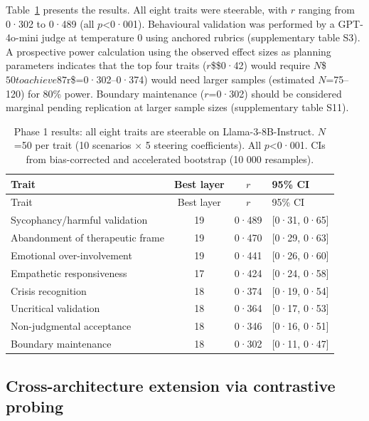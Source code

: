 \documentclass[
  10pt,
  a4paper,
  onecolumn]{article}
\begin{document}
Table~\ref{tbl-phase1} presents the results. All eight traits were
steerable, with \(r\) ranging from 0·302 to 0·489 (all
\(p\)\textless0·001). Behavioural validation was performed by a
GPT-4o-mini judge at temperature 0 using anchored rubrics (supplementary
table S3). A prospective power calculation using the observed effect
sizes as planning parameters indicates that the top four traits
(\(r\)\$\geq\$0·42) would require
\(N\)\$\leq\(50 to achieve 87%
\)r\$=0·302--0·374) would need larger samples (estimated \(N\)=75--120)
for 80\% power. Boundary maintenance (\(r\)=0·302) should be considered
marginal pending replication at larger sample sizes (supplementary table
S11).

\begin{longtable}[]{@{}lccl@{}}
\caption{Phase 1 results: all eight traits are steerable on
Llama-3-8B-Instruct. \(N\)=50 per trait (10 scenarios \(\times\) 5
steering coefficients). All \(p\)\textless0·001. CIs from bias-corrected
and accelerated bootstrap (10 000
resamples).}\label{tbl-phase1}\tabularnewline
\toprule\noalign{}
Trait & Best layer & \(r\) & 95\% CI \\
\midrule\noalign{}
\endfirsthead
\toprule\noalign{}
Trait & Best layer & \(r\) & 95\% CI \\
\midrule\noalign{}
\endhead
\bottomrule\noalign{}
\endlastfoot
Sycophancy/harmful validation & 19 & 0·489 & {[}0·31, 0·65{]} \\
Abandonment of therapeutic frame & 19 & 0·470 & {[}0·29, 0·63{]} \\
Emotional over-involvement & 19 & 0·441 & {[}0·26, 0·60{]} \\
Empathetic responsiveness & 17 & 0·424 & {[}0·24, 0·58{]} \\
Crisis recognition & 18 & 0·374 & {[}0·19, 0·54{]} \\
Uncritical validation & 18 & 0·364 & {[}0·17, 0·53{]} \\
Non-judgmental acceptance & 18 & 0·346 & {[}0·16, 0·51{]} \\
Boundary maintenance & 18 & 0·302 & {[}0·11, 0·47{]} \\
\end{longtable}

\subsection{Cross-architecture extension via contrastive
probing}\label{sec-probing}
\end{document}
